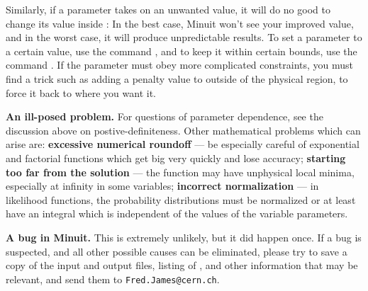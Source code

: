 \begin{UL}
      Similarly, if a parameter takes on an unwanted value, it will do no good
      to change its value inside : In the best case, 
      Minuit won't see your
      improved value, and in the worst case, it will produce unpredictable
      results. To set a parameter to a certain value, use the command
      , and to keep it within certain bounds, use the command
      .  If the parameter must obey more complicated constraints,
      you must find a trick such as adding a penalty value to  outside
      of the physical region, to force it back to where you want it.
\item {\bf An ill-posed problem.}
      For questions of parameter dependence, see the discussion above
      on postive-definiteness.
      Other mathematical problems which can arise are:
      {\bf excessive numerical roundoff} ---
      be especially careful of exponential and factorial functions
      which get big very quickly and lose accuracy;
      {\bf starting too far from the solution} ---
      the function may have unphysical local minima, especially
      at infinity in some variables;
      {\bf incorrect normalization} ---
      in likelihood functions, the probability distributions must
      be normalized or at least have an integral which is independent
      of the values of the variable parameters.
\item {\bf A bug in Minuit.}
      This is extremely unlikely, but it did happen once. If a bug is suspected, and
      all other possible causes can be eliminated, please try to save a copy of the
      input and output files, listing of , and other information that may be
      relevant, and send them to \texttt{Fred.James@cern.ch}.
\end{UL}




